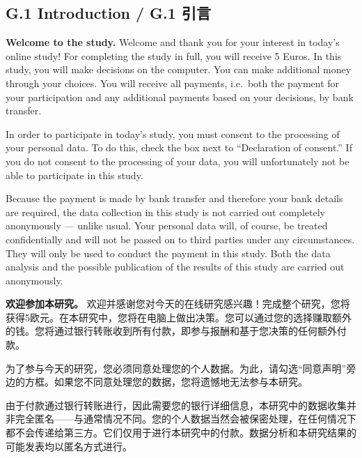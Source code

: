 \documentclass[12pt,a4paper]{article}
\newenvironment{original}
  {\par\medskip\noindent\color{black}\ignorespaces}
  {\par\medskip}
\newenvironment{translation}
  {\par\noindent\color{transblue}\ignorespaces}
  {\par\medskip\medskip}
\begin{document}
\subsection*{G.1 Introduction / G.1 引言}

\begin{original}
\textbf{Welcome to the study.} Welcome and thank you for your interest in today's online study! For completing the study in full, you will receive 5 Euros. In this study, you will make decisions on the computer. You can make additional money through your choices. You will receive all payments, i.e.\ both the payment for your participation and any additional payments based on your decisions, by bank transfer.

In order to participate in today's study, you must consent to the processing of your personal data. To do this, check the box next to ``Declaration of consent.'' If you do not consent to the processing of your data, you will unfortunately not be able to participate in this study.

Because the payment is made by bank transfer and therefore your bank details are required, the data collection in this study is not carried out completely anonymously --- unlike usual. Your personal data will, of course, be treated confidentially and will not be passed on to third parties under any circumstances. They will only be used to conduct the payment in this study. Both the data analysis and the possible publication of the results of this study are carried out anonymously.
\end{original}

\begin{translation}
\textbf{欢迎参加本研究。} 欢迎并感谢您对今天的在线研究感兴趣！完成整个研究，您将获得5欧元。在本研究中，您将在电脑上做出决策。您可以通过您的选择赚取额外的钱。您将通过银行转账收到所有付款，即参与报酬和基于您决策的任何额外付款。

为了参与今天的研究，您必须同意处理您的个人数据。为此，请勾选``同意声明''旁边的方框。如果您不同意处理您的数据，您将遗憾地无法参与本研究。

由于付款通过银行转账进行，因此需要您的银行详细信息，本研究中的数据收集并非完全匿名——与通常情况不同。您的个人数据当然会被保密处理，在任何情况下都不会传递给第三方。它们仅用于进行本研究中的付款。数据分析和本研究结果的可能发表均以匿名方式进行。
\end{translation}
\end{document}
